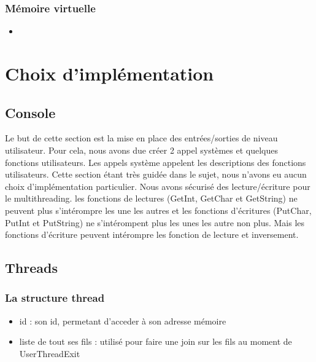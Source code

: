 \documentclass{article}
\begin{document}
		\subsubsection{Mémoire virtuelle}
			\begin{itemize}
				\item 
			\end{itemize}

\section{Choix d'implémentation}
	\subsection{Console}
	    {Le but de cette section est la mise en place des entrées/sorties de niveau utilisateur. Pour cela, nous avons due créer 2 appel systèmes et quelques fonctions utilisateurs. Les appels système appelent les descriptions des fonctions utilisateurs. Cette section étant très guidée dans le sujet, nous n'avons eu aucun choix d'implémentation particulier.
	    Nous avons sécurisé des lecture/écriture pour le multithreading. les fonctions de lectures (GetInt, GetChar et GetString) ne peuvent plus s'intérompre les une les autres et les fonctions d'écritures (PutChar, PutInt et PutString) ne s'intérompent plus les unes les autre non plus. Mais les fonctions d'écriture peuvent intérompre les fonction de lecture et inversement.}

	\subsection{Threads}
		\subsubsection{La structure thread}
			\begin{itemize}
				\item id : son id, permetant d'acceder à son adresse mémoire
				\item liste de tout ses fils : utilisé pour faire une join sur les fils au moment de UserThreadExit
			\end{itemize}
\end{document}
